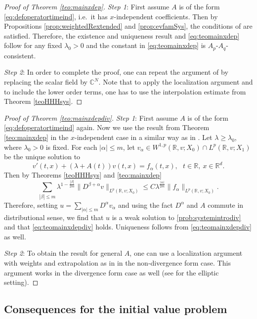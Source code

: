 \documentclass{amsart}
\theoremstyle{plain}
\theoremstyle{remark}
\theoremstyle{plain}
\numberwithin{equation}{section}
\begin{document}
\begin{proof}[Proof of Theorem \ref{teo:mainxdep}]
{\em Step 1}: First assume $A$ is of the form \eqref{eq:defoperatortimeind}, i.e.\ it has $x$-independent coefficients. Then
by Propositions \ref{prop:weightedRextended} and \ref{prop:evfamSys}, the conditions of \cite[Theorem 4.9]{GV} are satisfied. Therefore, the existence and uniqueness result and \eqref{eq:teomainxdep} follow for any fixed $\lambda_0>0$ and the constant in \eqref{eq:teomainxdep} is $A_p$-$A_q$-consistent.

{\em Step 2}: In order to complete the proof, one can repeat the argument of \cite[Theorem 5.4]{GV} by replacing the scalar field by ${ \mathbb{C} }^N$. Note that to apply the localization argument and to include the lower order terms, one has to use the interpolation estimate from Theorem \ref{teoHHHsys}.
\end{proof}

\begin{proof}[Proof of Theorem \ref{teo:mainxdepdiv}]
{\em Step 1}: First assume $A$ is of the form \eqref{eq:defoperatortimeind} again. Now we use the result from Theorem \ref{teo:mainxdep} in the $x$-independent case in a similar way as in \cite[Theorem 4.4.2]{krylov}. Let $\lambda\geq \lambda_0$, where $\lambda_0>0$ is fixed. For each $|\alpha|\leq m$, let
$v_{\alpha}\in W^{1,p}({ \mathbb{R} },v;X_0) \cap L^p({ \mathbb{R} },v;X_1)$ be the unique solution to
\[v'(t,x)+(\lambda+A(t))v(t,x)=f_{\alpha}(t,x),\ \ \ t\in{ \mathbb{R} },\ x\in{ \mathbb{R} }^{d}.\]
Then by Theorems \ref{teoHHHsys} and \ref{teo:mainxdep}
\[\sum_{|\beta|\leq m} \lambda^{1-\frac{|\beta|}{2m}} \|D^{\beta + \alpha} v\|_{L^p({ \mathbb{R} },v;X_0)} \leq C \lambda^{\frac{|\alpha|}{2m}} \|f_{\alpha}\|_{L^p({ \mathbb{R} },v;X_0)}.\]
Therefore, setting $u = \sum_{|\alpha|\leq m} D^{\alpha} v_{\alpha}$ and using the fact $D^{\alpha}$ and $A$ commute in distributional sense, we find that $u$ is a weak solution to \eqref{prob:systemintrodiv} and
that \eqref{eq:teomainxdepdiv} holds. Uniqueness follows from \eqref{eq:teomainxdepdiv} as well.

{\em Step 2}: To obtain the result for general $A$, one can use a localization argument with weights and extrapolation as in \cite[Theorem 5.4]{GV} in the non-divergence form case. This argument works in the divergence form case as well (see \cite[Section 13.6]{krylov} for the elliptic setting).
\end{proof}

\subsection{Consequences for the initial value problem}
\end{document}
